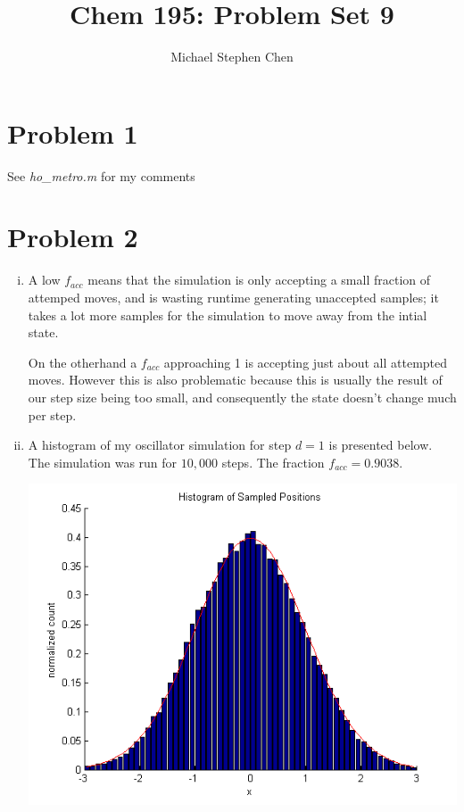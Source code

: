 \documentclass{article}
\title{Chem 195: Problem Set 9}
\author{Michael Stephen Chen}
\begin{document}
\maketitle
\pagebreak

\section*{Problem 1}
See \textit{ho\_metro.m} for my comments


\section*{Problem 2}
\begin{enumerate}[i.]
  \item A low $f_{acc}$ means that the simulation is only accepting a small fraction of attemped moves, and is wasting runtime generating unaccepted samples; it takes a lot more samples for the simulation to move away from the intial state.

    On the otherhand a $f_{acc}$ approaching 1 is accepting just about all attempted moves. However this is also problematic because this is usually the result of our step size being too small, and consequently the state doesn't change much per step.

  \item A histogram of my oscillator simulation for step $d=1$ is presented below. The simulation was run for $10,000$ steps. The fraction $f_{acc} = 0.9038$.
    \begin{center}
      \includegraphics[scale=0.5]{prob2b}
    \end{center}


\end{enumerate}
\end{document}
